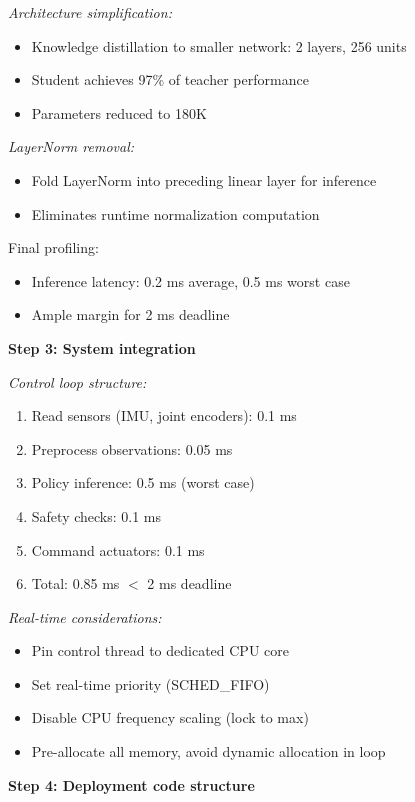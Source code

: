 \begin{example}
\textit{Architecture simplification:}
\begin{itemize}
    \item Knowledge distillation to smaller network: 2 layers, 256 units
    \item Student achieves 97\% of teacher performance
    \item Parameters reduced to 180K
\end{itemize}

\textit{LayerNorm removal:}
\begin{itemize}
    \item Fold LayerNorm into preceding linear layer for inference
    \item Eliminates runtime normalization computation
\end{itemize}

Final profiling:
\begin{itemize}
    \item Inference latency: 0.2 ms average, 0.5 ms worst case
    \item Ample margin for 2 ms deadline
\end{itemize}

\textbf{Step 3: System integration}

\textit{Control loop structure:}
\begin{enumerate}
    \item Read sensors (IMU, joint encoders): 0.1 ms
    \item Preprocess observations: 0.05 ms
    \item Policy inference: 0.5 ms (worst case)
    \item Safety checks: 0.1 ms
    \item Command actuators: 0.1 ms
    \item Total: 0.85 ms $<$ 2 ms deadline
\end{enumerate}

\textit{Real-time considerations:}
\begin{itemize}
    \item Pin control thread to dedicated CPU core
    \item Set real-time priority (SCHED\_FIFO)
    \item Disable CPU frequency scaling (lock to max)
    \item Pre-allocate all memory, avoid dynamic allocation in loop
\end{itemize}

\textbf{Step 4: Deployment code structure}


\end{example}
